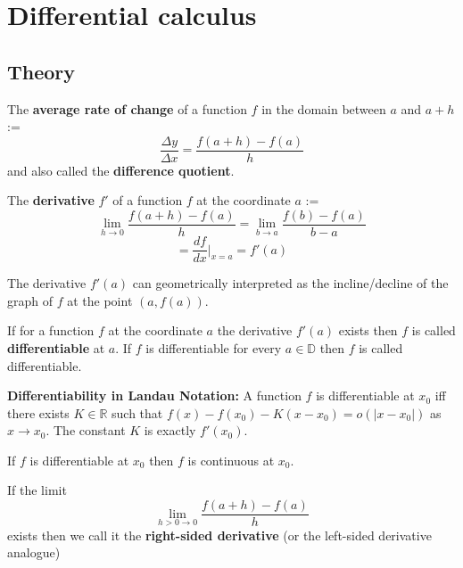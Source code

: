 \section{Differential calculus}

\subsection{Theory}

\begin{definition}
    The \textbf{average rate of change} of a function $f$ in the domain between $a$ and $a + h$ :=
    $$\frac{\Delta y}{\Delta x} = \frac{f(a+h)-f(a)}{h}$$
    and also called the \textbf{difference quotient}.
\end{definition}

\begin{definition}
    The \textbf{derivative} $f'$ of a function $f$ at the coordinate $a$ :=
    $$\lim_{h \to 0}\frac{f(a+h)-f(a)}{h} = \lim_{b \to a}\frac{f(b)-f(a)}{b-a}$$
    $$ = \frac{df}{dx}\vert_{x=a} = f'(a)$$
\end{definition}

\begin{remark}
    The derivative $f'(a)$ can geometrically interpreted as the incline/decline of the graph of $f$ at the point $(a, f(a))$.
\end{remark}

\begin{definition}
    If for a function $f$ at the coordinate $a$ the derivative $f'(a)$ exists then $f$ is called \textbf{differentiable} at $a$. If $f$ is differentiable for every $a \in \mathbb{D}$ then $f$ is called differentiable.
\end{definition}

\begin{theorem}
    \textbf{Differentiability in Landau Notation:} A function $f$ is differentiable at $x_0$ iff there exists $K \in \mathbb{R}$ such that $f(x) - f(x_0) - K(x - x_0) = o(|x - x_0|)$ as $x \to x_0$. The constant $K$ is exactly $f'(x_0)$.
\end{theorem}

\begin{lemma}
    If $f$ is differentiable at $x_0$ then $f$ is continuous at $x_0$.
\end{lemma}

\begin{definition}
    If the limit 
    $$\lim_{h>0 \to 0}\frac{f(a+h)-f(a)}{h}$$
    exists then we call it the \textbf{right-sided derivative} (or the left-sided derivative analogue)
\end{definition}

